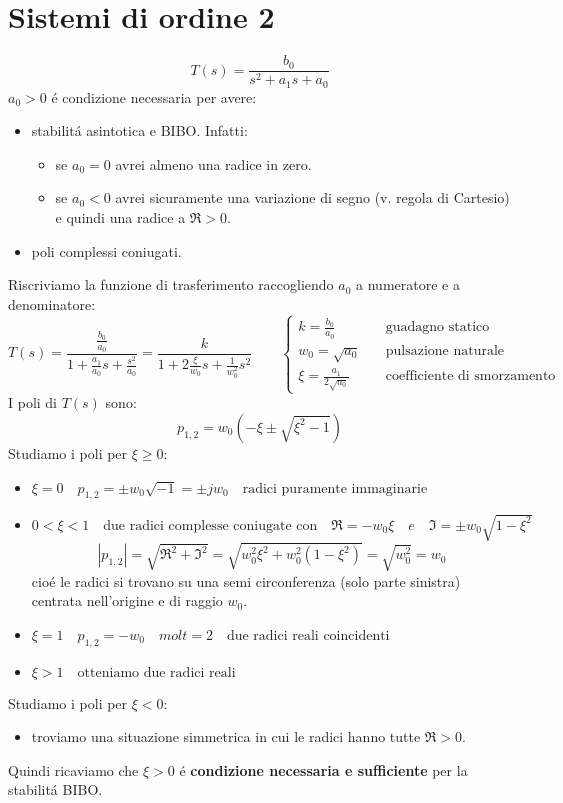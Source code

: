 \documentclass[../main.tex]{subfiles}
\begin{document}
	\section{Sistemi di ordine 2}
		\[ 
			T(s) = \frac{b_0}{s^2+a_1s+a_0}
		\]
		$ a_0 > 0 $ \'e condizione necessaria per avere:
		\begin{itemize}
			\item 
				stabilit\'a asintotica e BIBO. Infatti:
				\begin{itemize}
					\item 
						se $ a_0 = 0 $ avrei almeno una radice in zero.
					\item 
						se $ a_0 < 0 $ avrei sicuramente una variazione di segno (v. regola di Cartesio) e quindi una radice a $ \Re>0 $.
				\end{itemize}
			\item 
				poli complessi coniugati.
		\end{itemize}
		Riscriviamo la funzione di trasferimento raccogliendo $ a_0 $ a numeratore e a denominatore:
		\[ 
			T(s) = \frac{\frac{b_0}{a_0}}{1+\frac{a_1}{a_0}s+\frac{s^2}{a_0}} = \frac{k}{1 + 2\frac{\xi}{w_0}s + \frac{1}{w_0^2}s^2}
			\qquad
			\begin{cases}
				k = \frac{b_0}{a_0} \quad &\text{guadagno statico}
				\\
				w_0 = \sqrt{a_0} \quad &\text{pulsazione naturale}
				\\
				\xi = \frac{a_1}{2\sqrt{a_0}} \quad &\text{coefficiente di smorzamento}
			\end{cases}
		\]
		I poli di $T(s)$ sono:
		\[ 
			p_{1,2} = w_0(-\xi \pm \sqrt{\xi^2-1})
		\]
		Studiamo i poli per $ \xi \geq 0 $:
		\begin{itemize}
			\item 
				$ \xi = 0 \quad p_{1,2} =\pm w_0 \sqrt{-1} = \pm jw_0 \quad \text{radici puramente immaginarie}$
			\item 
				$ 0 < \xi < 1 \quad \text{due radici complesse coniugate con} \quad \Re = -w_0\xi \quad e \quad \Im = \pm w_0 \sqrt{1-\xi^2} $
				\[ 
					\left| p_{1,2} \right| = \sqrt{\Re^2 + \Im^2} = \sqrt{w_0^2\xi^2 + w_0^2(1-\xi^2)} = \sqrt{w_0^2} = w_0
				\]
				cio\'e le radici si trovano su una semi circonferenza (solo parte sinistra) centrata nell'origine e di raggio $ w_0 $.
			\item 
				$ \xi = 1 \quad p_{1,2} = -w_0 \quad molt=2 \quad \text{due radici reali coincidenti} $
			\item 
				$ \xi > 1 \quad \text{otteniamo due radici reali} $
		\end{itemize}
		Studiamo i poli per $ \xi < 0 $:
		\begin{itemize}
			\item troviamo una situazione simmetrica in cui le radici hanno tutte $ \Re > 0 $.
		\end{itemize}
		Quindi ricaviamo che $ \xi > 0 $ \'e \textbf{condizione necessaria e sufficiente} per la stabilit\'a BIBO.
		
\end{document}
